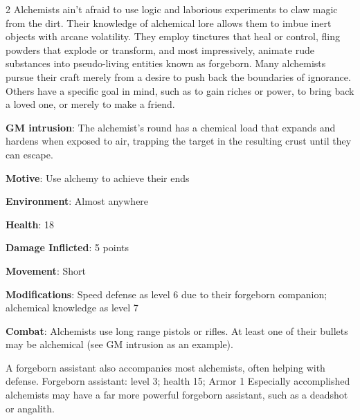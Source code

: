 \begin{multicols}{2}
Alchemists ain’t afraid to use logic and laborious experiments to claw magic from the dirt. Their knowledge of alchemical lore allows them to imbue inert objects with arcane volatility. They employ tinctures that heal or control, fling powders that explode or transform, and most impressively, animate rude substances into pseudo-living entities known as forgeborn. Many alchemists pursue their craft merely from a desire to push back the boundaries of ignorance. Others have a specific goal in mind, such as to gain riches or power, to bring back a loved one, or merely to make a friend.

\textbf{GM intrusion}: The alchemist’s round has a chemical load that expands and hardens when exposed to air, trapping the target in the resulting crust until they can escape.

\textbf{Motive}: Use alchemy to achieve their ends 

\textbf{Environment}: Almost anywhere 

\textbf{Health}: 18 

\textbf{Damage Inflicted}: 5 points 

\textbf{Movement}: Short 

\textbf{Modifications}: Speed defense as level 6 due to their forgeborn companion; alchemical knowledge as level 7 

\textbf{Combat}: Alchemists use long range pistols or rifles. At least one of their bullets may be alchemical (see GM intrusion as an example). 

A forgeborn assistant also accompanies most alchemists, often helping with defense. Forgeborn assistant: level 3; health 15; Armor 1 Especially accomplished alchemists may have a far more powerful forgeborn assistant, such as a deadshot or angalith.


\end{multicols}
